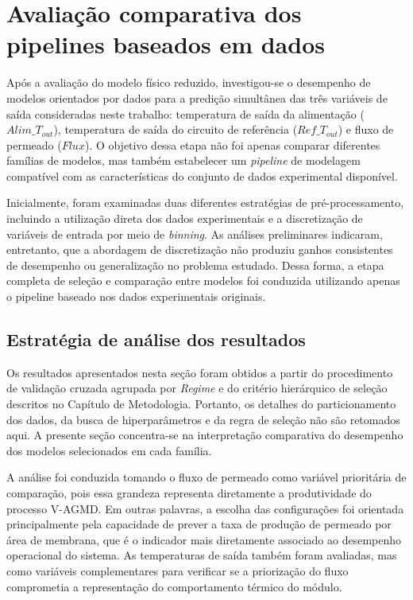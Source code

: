 \section{Avaliação comparativa dos pipelines baseados em dados}
\label{subsec:avaliacao_pipelines_dados}

Após a avaliação do modelo físico reduzido, investigou-se o desempenho de modelos orientados por dados para a predição simultânea das três variáveis de saída consideradas neste trabalho: temperatura de saída da alimentação ($Alim\_T_{out}$), temperatura de saída do circuito de referência ($Ref\_T_{out}$) e fluxo de permeado ($Flux$). O objetivo dessa etapa não foi apenas comparar diferentes famílias de modelos, mas também estabelecer um \textit{pipeline} de modelagem compatível com as características do conjunto de dados experimental disponível.

Inicialmente, foram examinadas duas diferentes estratégias de pré-processamento, incluindo a utilização direta dos dados experimentais e a discretização de variáveis de entrada por meio de \textit{binning}. As análises preliminares indicaram, entretanto, que a abordagem de discretização não produziu ganhos consistentes de desempenho ou generalização no problema estudado. Dessa forma, a etapa completa de seleção e comparação entre modelos foi conduzida utilizando apenas o pipeline baseado nos dados experimentais originais.

\subsection{Estratégia de análise dos resultados}
\label{subsubsec:estrategia_validacao}

Os resultados apresentados nesta seção foram obtidos a partir do procedimento de validação cruzada agrupada por \textit{Regime} e do critério hierárquico de seleção descritos no Capítulo de Metodologia. Portanto, os detalhes do particionamento dos dados, da busca de hiperparâmetros e da regra de seleção não são retomados aqui. A presente seção concentra-se na interpretação comparativa do desempenho dos modelos selecionados em cada família.

A análise foi conduzida tomando o fluxo de permeado como variável prioritária de comparação, pois essa grandeza representa diretamente a produtividade do processo V-AGMD. Em outras palavras, a escolha das configurações foi orientada principalmente pela capacidade de prever a taxa de produção de permeado por área de membrana, que é o indicador mais diretamente associado ao desempenho operacional do sistema. As temperaturas de saída também foram avaliadas, mas como variáveis complementares para verificar se a priorização do fluxo comprometia a representação do comportamento térmico do módulo.

